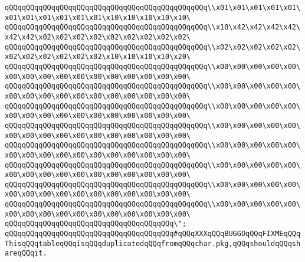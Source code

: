 \verb|qQQqqQQqqQQqqQQqqQQqqQQqqQQqqQQqqQQqqQQqqQQqqQQq\\x01\x01\x01\x01\x01\x01\x01\x01\x01\x01\x01\x10\x10\x10\x10\x10\|\newline
\verb|qQQqqQQqqQQqqQQqqQQqqQQqqQQqqQQqqQQqqQQqqQQqqQQq\\x10\x42\x42\x42\x42\x42\x42\x02\x02\x02\x02\x02\x02\x02\x02\x02\|\newline
\verb|qQQqqQQqqQQqqQQqqQQqqQQqqQQqqQQqqQQqqQQqqQQqqQQq\\x02\x02\x02\x02\x02\x02\x02\x02\x02\x02\x02\x10\x10\x10\x10\x20\|\newline
\verb|qQQqqQQqqQQqqQQqqQQqqQQqqQQqqQQqqQQqqQQqqQQqqQQq\\x00\x00\x00\x00\x00\x00\x00\x00\x00\x00\x00\x00\x00\x00\x00\x00\|\newline
\verb|qQQqqQQqqQQqqQQqqQQqqQQqqQQqqQQqqQQqqQQqqQQqqQQq\\x00\x00\x00\x00\x00\x00\x00\x00\x00\x00\x00\x00\x00\x00\x00\x00\|\newline
\verb|qQQqqQQqqQQqqQQqqQQqqQQqqQQqqQQqqQQqqQQqqQQqqQQq\\x00\x00\x00\x00\x00\x00\x00\x00\x00\x00\x00\x00\x00\x00\x00\x00\|\newline
\verb|qQQqqQQqqQQqqQQqqQQqqQQqqQQqqQQqqQQqqQQqqQQqqQQq\\x00\x00\x00\x00\x00\x00\x00\x00\x00\x00\x00\x00\x00\x00\x00\x00\|\newline
\verb|qQQqqQQqqQQqqQQqqQQqqQQqqQQqqQQqqQQqqQQqqQQqqQQq\\x00\x00\x00\x00\x00\x00\x00\x00\x00\x00\x00\x00\x00\x00\x00\x00\|\newline
\verb|qQQqqQQqqQQqqQQqqQQqqQQqqQQqqQQqqQQqqQQqqQQqqQQq\\x00\x00\x00\x00\x00\x00\x00\x00\x00\x00\x00\x00\x00\x00\x00\x00\|\newline
\verb|qQQqqQQqqQQqqQQqqQQqqQQqqQQqqQQqqQQqqQQqqQQqqQQq\\x00\x00\x00\x00\x00\x00\x00\x00\x00\x00\x00\x00\x00\x00\x00\x00\|\newline
\verb|qQQqqQQqqQQqqQQqqQQqqQQqqQQqqQQqqQQqqQQqqQQqqQQq\\x00\x00\x00\x00\x00\x00\x00\x00\x00\x00\x00\x00\x00\x00\x00\x00\|\newline
\verb|qQQqqQQqqQQqqQQqqQQqqQQqqQQqqQQqqQQqqQQq\";|\newline
\verb|qQQqqQQqqQQqqQQqqQQqqQQqqQQqqQQqqQQqqQQq#qQQqXXXqQQqBUGGOqQQqFIXMEqQQqThisqQQqtableqQQqisqQQqduplicatedqQQqfromqQQqchar.pkg,qQQqshouldqQQqshareqQQqit.|\newline
